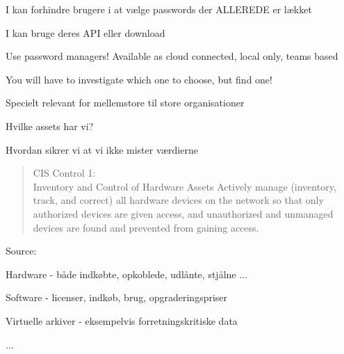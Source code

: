 \documentclass[Screen16to9,17pt]{foils}
\begin{document}
\begin{list1}
\item I kan forhindre brugere i at vælge passwords der ALLEREDE er lækket
\item I kan bruge deres API eller download\\
{\footnotesize{}}
\end{list1}




\begin{list2}
\item Use password managers! Available as cloud connected, local only, teams based
\item You will have to investigate which one to choose, but find one!
\end{list2}






\begin{list2}
\item Specielt relevant for mellemstore til store organisationer
\item Hvilke assets har vi?
\item Hvordan sikrer vi at vi ikke mister værdierne
\end{list2}



\begin{quote}
CIS Control 1:\\
Inventory and Control of Hardware Assets
Actively manage (inventory, track, and correct) all hardware devices on the network so that only
authorized devices are given access, and unauthorized and unmanaged devices are found and
prevented from gaining access.
\end{quote}
Source: 

\begin{list2}
\item Hardware - både indkøbte, opkoblede, udlånte, stjålne ...
\item Software - licenser, indkøb, brug, opgraderingspriser
\item Virtuelle arkiver - eksempelvis forretningskritiske data
\item ...
\end{list2}
\end{document}
